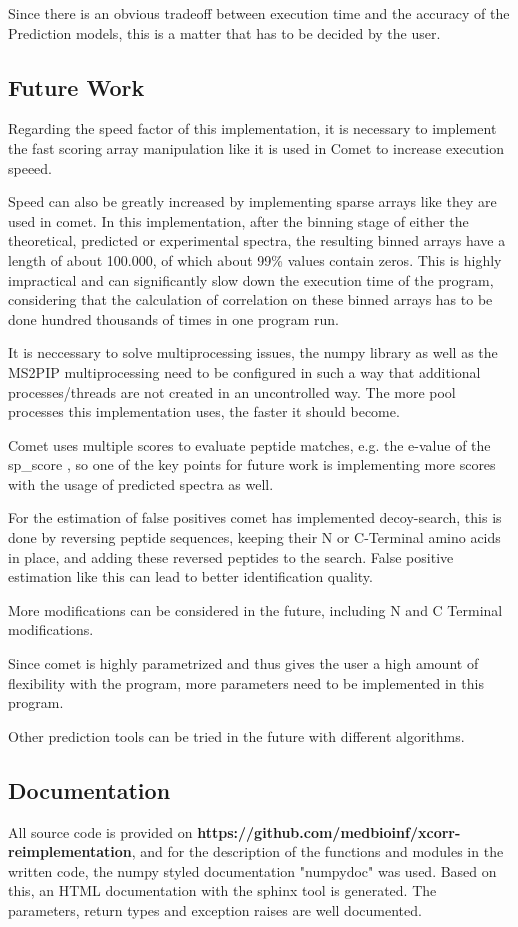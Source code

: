 \documentclass[11pt]{article}
\begin{document}
Since there is an obvious tradeoff between execution time and the accuracy of the Prediction models, this is a matter that has to be decided by the user.

\subsection{Future Work}
Regarding the speed factor of this implementation, it is necessary to implement the fast scoring array manipulation like it is used in Comet to increase execution speeed. 

Speed can also be greatly increased by implementing sparse arrays like they are used in comet. In this implementation, after the binning stage of either the theoretical, predicted or experimental spectra, the resulting binned arrays have a length of about 100.000, of which about 99\% values contain zeros. This is highly impractical and can significantly slow down the execution time of the program, considering that the calculation of correlation on these binned arrays has to be done hundred thousands of times in one program run.

It is neccessary to solve multiprocessing issues, the numpy library as well as the MS2PIP multiprocessing need to be configured in such a way that additional processes/threads are not created in an uncontrolled way. The more pool processes this implementation uses, the faster it should become.

Comet uses multiple scores to evaluate peptide matches, e.g. the e-value of the sp\_score , so one of the key points for future work is implementing more scores with the usage of predicted spectra as well.

For the estimation of false positives comet has implemented decoy-search, this is done by reversing peptide sequences, keeping their N or C-Terminal amino acids in place, and adding these reversed peptides to the search. False positive estimation like this can lead to better identification quality.

More modifications can be considered in the future, including N and C Terminal modifications.

Since comet is highly parametrized and thus gives the user a high amount of flexibility with the program, more parameters need to be implemented in this program.

Other prediction tools can be tried in the future with different algorithms.

\subsection{Documentation}
All source code is provided on \textbf{https://github.com/medbioinf/xcorr-reimplementation}, and for the description of the functions and modules in the written code, the numpy styled documentation "numpydoc" was used. Based on this, an HTML documentation with the sphinx tool is generated. The parameters, return types and exception raises are well documented.

\newpage

\printbibliography
\end{document}
